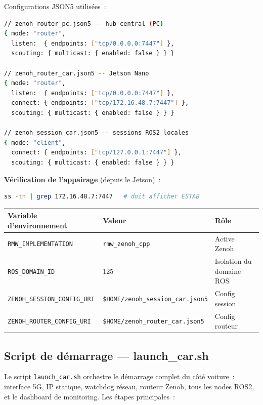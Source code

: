 \documentclass[a4paper,11pt]{article}
\begin{document}
Configurations JSON5 utilisées~:

\begin{lstlisting}[language=bash]
// zenoh_router_pc.json5 -- hub central (PC)
{ mode: "router",
  listen:  { endpoints: ["tcp/0.0.0.0:7447"] },
  scouting: { multicast: { enabled: false } } }

// zenoh_router_car.json5 -- Jetson Nano
{ mode: "router",
  listen:  { endpoints: ["tcp/0.0.0.0:7447"] },
  connect: { endpoints: ["tcp/172.16.48.7:7447"] },
  scouting: { multicast: { enabled: false } } }

// zenoh_session_car.json5 -- sessions ROS2 locales
{ mode: "client",
  connect: { endpoints: ["tcp/127.0.0.1:7447"] },
  scouting: { multicast: { enabled: false } } }
\end{lstlisting}

\textbf{Vérification de l'appairage} (depuis le Jetson)~:
\begin{lstlisting}[language=bash]
ss -tn | grep 172.16.48.7:7447   # doit afficher ESTAB
\end{lstlisting}

\begin{center}
\begin{tabular}{lll}
\toprule
\textbf{Variable d'environnement} & \textbf{Valeur} & \textbf{Rôle} \\
\midrule
\texttt{RMW\_IMPLEMENTATION} & \texttt{rmw\_zenoh\_cpp} & Active Zenoh \\
\texttt{ROS\_DOMAIN\_ID}     & 125 & Isolation du domaine ROS \\
\texttt{ZENOH\_SESSION\_CONFIG\_URI} & \texttt{\$HOME/zenoh\_session\_car.json5} & Config session \\
\texttt{ZENOH\_ROUTER\_CONFIG\_URI}  & \texttt{\$HOME/zenoh\_router\_car.json5} & Config routeur \\
\bottomrule
\end{tabular}
\end{center}

\subsection{Script de démarrage — launch\_car.sh}

Le script \texttt{launch\_car.sh} orchestre le démarrage complet du côté voiture~:
interface 5G, IP statique, watchdog réseau, routeur Zenoh, tous les nodes ROS2, et
le dashboard de monitoring. Les étapes principales~:
\end{document}
